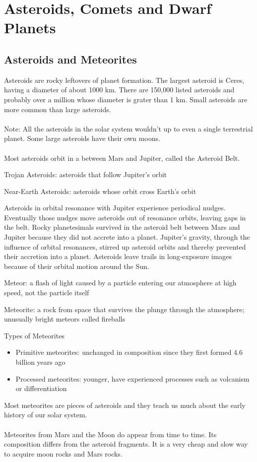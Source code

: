 \documentclass[12pt]{article}
\begin{document}
\section{Asteroids, Comets and Dwarf Planets} 
\subsection{Asteroids and Meteorites} 
Asteroids are rocky leftovers of planet formation. The largest asteroid is Ceres, having a diameter of about 1000 km. There are 150,000 listed asteroids and probably over a million whose diameter is grater than 1 km. Small asteroids are more common than large asteroids. \\~\\
Note: All the asteroids in the solar system wouldn't up to even a single terrestrial planet. Some large asteroids have their own moons. \\~\\
Most asteroids orbit in a between Mars and Jupiter, called the Asteroid Belt. 
\begin{definition} Trojan Asteroids: asteroids that follow Jupiter's orbit \end{definition} 
\begin{definition} Near-Earth Asteroids: asteroids whose orbit cross Earth's orbit \end{definition} 
Asteroids in orbital resonance with Jupiter experience periodical nudges. Eventually those nudges move asteroids out of resonance orbits, leaving gaps in the belt. Rocky planetesimals survived in the asteroid belt between Mars and Jupiter because they did not accrete into a planet. Jupiter's gravity, through the influence of orbital resonances, stirred up asteroid orbits and thereby prevented their accretion into a planet. Asteroids leave trails in long-exposure images because of their orbital motion around the Sun. 
\begin{definition} Meteor: a flash of light caused by a particle entering our atmosphere at high speed, not the particle itself \end{definition}
\begin{definition} Meteorite: a rock from space that survives the plunge through the atmosphere; unusually bright meteors called fireballs \end{definition}
Types of Meteorites \begin{itemize} 
\item Primitive meteorites: unchanged in composition since they first formed 4.6 billion years ago
\item Processed meteorites: younger, have experienced processes such as volcanism or differentiation \end{itemize} 
Most meteorites are pieces of asteroids and they teach us much about the early history of our solar system. \\~\\
Meteorites from Mars and the Moon do appear from time to time. Its composition differs from the asteroid fragments. It is a very cheap and slow way to acquire moon rocks and Mars rocks.
\end{document}
